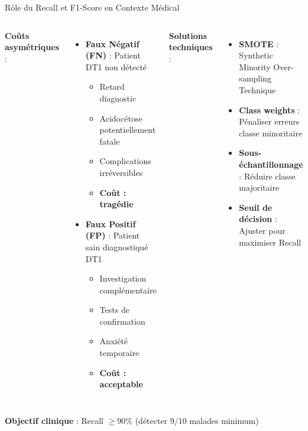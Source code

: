 \documentclass[11pt, aspectratio=169]{beamer}
\begin{document}
\begin{frame}{Rôle du Recall et F1-Score en Contexte Médical}
  \begin{columns}[T]
    \textbf{\color{accent2} Coûts asymétriques} :
    \begin{itemize}
      \item \textbf{Faux Négatif (FN)} : Patient DT1 non détecté
      \begin{itemize}
        \item Retard diagnostic
        \item Acidocétose potentiellement fatale
        \item Complications irréversibles
        \item \textbf{\textcolor{accent1}{Coût : tragédie}}
      \end{itemize}
      \vspace{0.4em}
      \item \textbf{Faux Positif (FP)} : Patient sain diagnostiqué DT1
      \begin{itemize}
        \item Investigation complémentaire
        \item Tests de confirmation
        \item Anxiété temporaire
        \item \textbf{Coût : acceptable}
      \end{itemize}
    \end{itemize}
    
    \textbf{\color{accent2} Solutions techniques} :
    \begin{itemize}
      \item \textbf{SMOTE} : Synthetic Minority Over-sampling Technique
      \item \textbf{Class weights} : Pénaliser erreurs classe minoritaire
      \item \textbf{Sous-échantillonnage} : Réduire classe majoritaire
      \item \textbf{Seuil de décision} : Ajuster pour maximiser Recall
    \end{itemize}
  \end{columns}
  
  \vspace{1em}
  
  \textbf{\textcolor{accent1}{Objectif clinique}} : Recall $\geq 90\%$ (détecter 9/10 malades minimum)
\end{frame}
\end{document}
